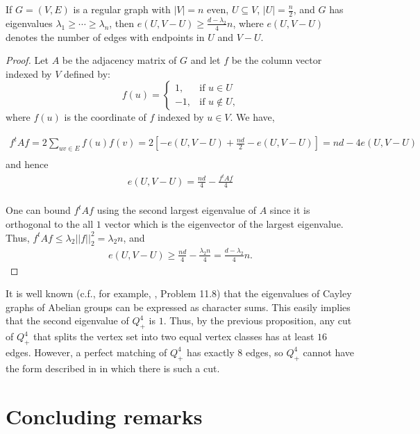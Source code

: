 \begin{prop}
If $G = (V, E)$ is a regular graph with $|V| = n$ even, 
$U \subseteq V$, $|U| = \frac{n}{2}$, and $G$ 
has eigenvalues $\lambda_1 \geq \cdots \geq \lambda_n$, 
then $e(U, V - U) \geq \frac{d - \lambda_2}{4}n$, 
where $e(U, V-U)$ denotes the number of edges with endpoints 
in $U$ and $V - U$.
\end{prop}

\begin{proof}
    Let $A$ be the adjacency matrix 
of $G$ and let $f$ be the column vector indexed by $V$ defined by:
    \[
    f(u)= 
\begin{cases}
    1,& \text{if } u \in U \\
    -1,              & \text{if $u \notin U$,}
\end{cases}
\] 
where $f(u)$ is the coordinate of $f$ indexed by $u \in V$. We have,

\begin{align*}
    f^tAf = 2 \sum_{uv \in E}f(u)f(v) = 
2[-e(U, V-U) + \frac{nd}{2} - e(U, V-U)] = nd - 4e(U, V-U) \\
\end{align*}
and hence
\begin{align*}
    e(U, V-U) = \frac{nd}{4} - \frac{f^tAf}{4} \\
\end{align*}

One can bound $f^tAf$ using the second largest eigenvalue of $A$ 
since it is orthogonal to the all $1$ vector which is the eigenvector of
the largest eigenvalue. 
Thus, $f^tAf \leq \lambda_2||f||_2^2 =\lambda_2n$, and 
\begin{align*}
    e(U, V-U) \geq \frac{nd}{4} - \frac{\lambda_2n}{4} 
= \frac{d-\lambda_2}{4}n.
\end{align*} 
\end{proof}
It is well known (c.f., for example, \cite{Lo}, Problem 11.8)
that the eigenvalues of Cayley graphs of Abelian
groups can be expressed as character sums. This easily implies that
the second eigenvalue of $Q_{+}^{4}$ is $1$. Thus, by the previous 
proposition, any cut of $Q_{+}^{4}$ that splits the vertex set into 
two equal vertex classes
has at least $16$ edges. However, a perfect matching of $Q_+^4$ has 
exactly $8$ edges, so $Q_+^4$ cannot have the form described
in \cite{BCKW} in which there is such a cut. 


\section{Concluding remarks}

